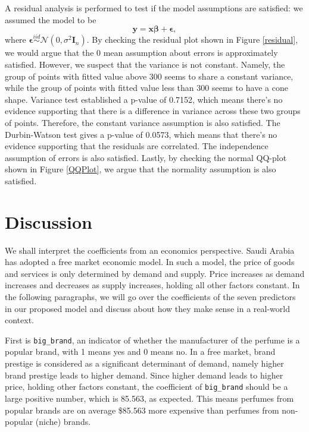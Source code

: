 \documentclass[12pt]{amsart}
\begin{document}
A residual analysis is performed to test if the model assumptions are satisfied: we assumed the model to be 
$$\boldsymbol{y} = \boldsymbol{x\beta} + \boldsymbol{\epsilon},$$
where $\boldsymbol{\epsilon} \stackrel{iid}{\sim} \mathcal{N}(0, \sigma^2 \boldsymbol{I}_n)$. By checking the residual plot shown in Figure \ref{residual}, we would argue that the 0 mean assumption about errors is approximately satisfied. However, we suspect that the variance is not constant. Namely, the group of points with fitted value above 300 seems to share a constant variance, while the group of points with fitted value less than 300 seems to have a cone shape. Variance test established a p-value of 0.7152, which means there's no evidence supporting that there is a difference in variance across these two groups of points. Therefore, the constant variance assumption is also satisfied. The Durbin-Watson test gives a p-value of 0.0573, which means that there's no evidence supporting that the residuals are correlated. The independence assumption of errors is also satisfied. Lastly, by checking the normal QQ-plot shown in Figure \ref{QQPlot}, we argue that the normality assumption is also satisfied. 

\section{Discussion}

We shall interpret the coefficients from an economics perspective. Saudi Arabia has 
adopted a free market economic model. In such a model, the price of goods and services is only 
determined by demand and supply. Price increases as demand increases and decreases as supply 
increases, holding all other factors constant. In the following paragraphs, we will go over the 
coefficients of the seven predictors in our proposed model and discuss about how they make 
sense in a real-world context.

First is \texttt{big\_brand}, an indicator of whether the manufacturer of the perfume is a popular 
brand, with 1 means yes and 0 means no. In a free market, brand prestige is considered as a 
significant determinant of demand, namely higher brand prestige leads to higher demand. Since 
higher demand leads to higher price, holding other factors constant, the coefficient of \texttt{big\_brand}
should be a large positive number, which is 85.563, as expected. This means perfumes from popular 
brands are on average \$85.563 more expensive than perfumes from non-popular (niche) brands.
\end{document}
